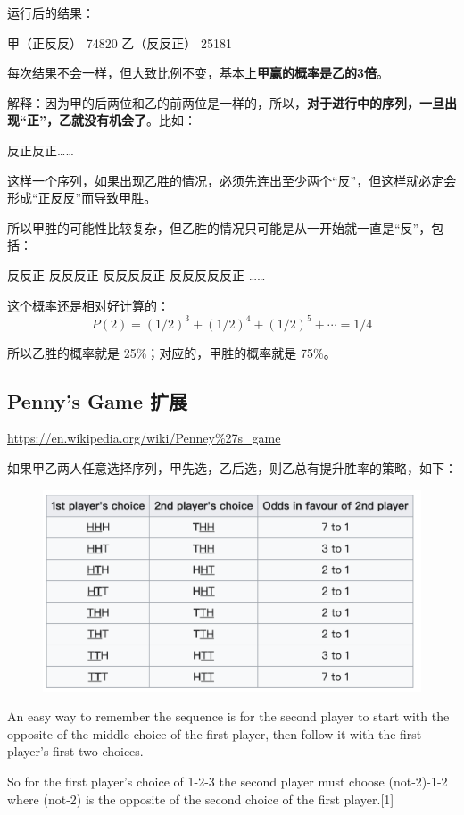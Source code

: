 \documentclass[12pt]{article}
\begin{document}
运行后的结果：
\begin{python}
甲（正反反） 74820
乙（反反正） 25181
\end{python}

每次结果不会一样，但大致比例不变，基本上\textbf{甲赢的概率是乙的3倍}。

解释：因为甲的后两位和乙的前两位是一样的，所以，\textbf{对于进行中的序列，一旦出现“正”，乙就没有机会了}。比如：
\begin{python}
反正反正……
\end{python}
这样一个序列，如果出现乙胜的情况，必须先连出至少两个“反”，但这样就必定会形成“正反反”而导致甲胜。

所以甲胜的可能性比较复杂，但乙胜的情况只可能是从一开始就一直是“反”，包括：
\begin{python}
反反正
反反反正
反反反反正
反反反反反正
……
\end{python}

这个概率还是相对好计算的：
$$
P(2) = (1/2)^3 + (1/2)^4 + (1/2)^5 + \cdots = 1/4
$$

所以乙胜的概率就是 25\%；对应的，甲胜的概率就是 75\%。

\subsection{Penny's Game 扩展}
\url{https://en.wikipedia.org/wiki/Penney%27s_game}

如果甲乙两人任意选择序列，甲先选，乙后选，则乙总有提升胜率的策略，如下：
\begin{figure}[H]
    \centering
    \includegraphics[width=.8\textwidth]{fig/Probability_Penny_Game.png}
\end{figure}

An easy way to remember the sequence is for the second player to start with the opposite of the middle choice of the first player, then follow it with the first player's first two choices.

So for the first player's choice of 1-2-3
the second player must choose (not-2)-1-2
where (not-2) is the opposite of the second choice of the first player.[1]



\end{document}
